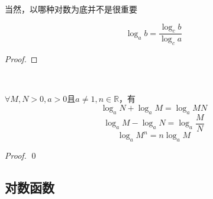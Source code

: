 当然，以哪种对数为底并不是很重要
\begin{theorem}[换底公式]
    \[\log_a b=\frac{\log_c b}{\log_c a}\]
\end{theorem}
\begin{proof}
    
\end{proof}

\begin{theorem}[对数的运算法则]
    \ 

    $\forall M,N>0,a>0$且$a\ne1,n\in\mathbb{R}$，有
    \[\log_aN+\log_aM=\log_aMN\]
    \[\log_aM-\log_aN=\log_a\frac{M}{N}\]
    \[\log_aM^n=n\log_aM\]
\end{theorem}
\begin{proof}
    

    \qed
\end{proof}
\begin{example}[对数表的应用]
    
\end{example}
\begin{example}
    
\end{example}

\begin{corollary}
    
\end{corollary}
\clearpage
\subsection{对数函数}

\clearpage

